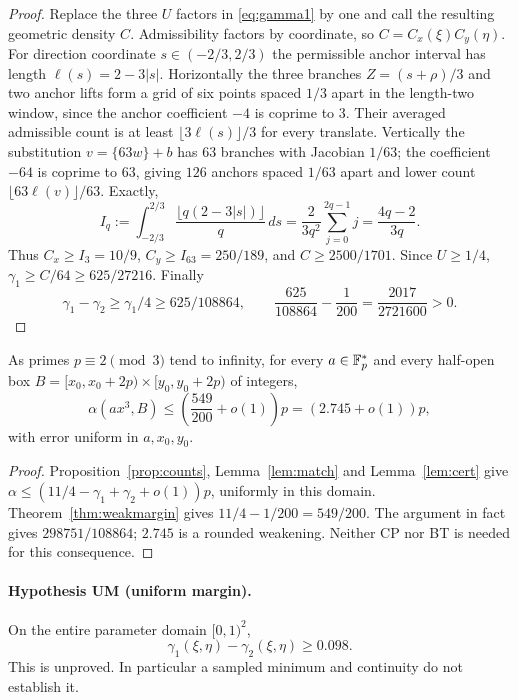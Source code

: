 \begin{proof}
Replace the three $U$ factors in \eqref{eq:gamma1} by one and call the resulting geometric density $C$.
Admissibility factors by coordinate, so $C=C_x(\xi)C_y(\eta)$.
For direction coordinate $s\in(-2/3,2/3)$ the permissible anchor interval has length $\ell(s)=2-3|s|$.
Horizontally the three branches $Z=(s+\rho)/3$ and two anchor lifts form a grid of six points spaced $1/3$ apart
in the length-two window, since the anchor coefficient $-4$ is coprime to $3$.
Their averaged admissible count is at least $\lfloor3\ell(s)\rfloor/3$ for every translate.
Vertically the substitution $v=\{63w\}+b$ has $63$ branches with Jacobian $1/63$;
the coefficient $-64$ is coprime to $63$, giving $126$ anchors spaced $1/63$ apart and lower count
$\lfloor63\ell(v)\rfloor/63$.  Exactly,
\[
 I_q:=\int_{-2/3}^{2/3}\frac{\lfloor q(2-3|s|)\rfloor}{q}\,ds
 =\frac{2}{3q^2}\sum_{j=0}^{2q-1}j=\frac{4q-2}{3q}.
\]
Thus $C_x\ge I_3=10/9$, $C_y\ge I_{63}=250/189$, and $C\ge2500/1701$.
Since $U\ge1/4$, $\gamma_1\ge C/64\ge625/27216$.  Finally
\[
 \gamma_1-\gamma_2\ge\gamma_1/4\ge625/108864,
 \qquad \frac{625}{108864}-\frac1{200}=\frac{2017}{2721600}>0.
\]
\end{proof}

\begin{theorem}\label{thm:cubic2745}
As primes $p\equiv2\pmod3$ tend to infinity, for every $a\in\mathbb{F}_p^*$ and every half-open box
$B=[x_0,x_0+2p)\times[y_0,y_0+2p)$ of integers,
\[
 \alpha(ax^3,B)\le\left(\frac{549}{200}+o(1)\right)p=(2.745+o(1))p,
\]
with error uniform in $a,x_0,y_0$.
\end{theorem}
\begin{proof}
Proposition~\ref{prop:counts}, Lemma~\ref{lem:match} and Lemma~\ref{lem:cert} give
$\alpha\le(11/4-\gamma_1+\gamma_2+o(1))p$, uniformly in this domain.
Theorem~\ref{thm:weakmargin} gives $11/4-1/200=549/200$.
The argument in fact gives $298751/108864$; $2.745$ is a rounded weakening.
Neither CP nor BT is needed for this consequence.
\end{proof}

\paragraph{Hypothesis UM (uniform margin).}\label{hyp:margin}
On the entire parameter domain $[0,1)^2$,
\begin{equation}\label{eq:margin}
 \gamma_1(\xi,\eta)-\gamma_2(\xi,\eta)\ge0.098.
\end{equation}
This is unproved.  In particular a sampled minimum and continuity do not establish it.

